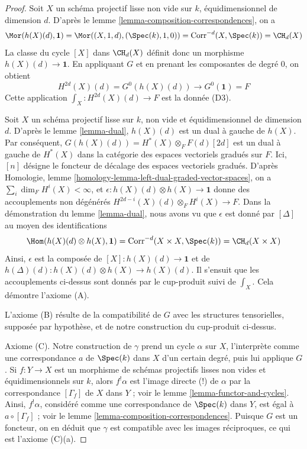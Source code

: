 \begin{proof}
\medskip\noindent
Soit $X$ un schéma projectif lisse non vide sur $k$,
équidimensionnel de dimension $d$. D'après
le lemme \ref{lemma-composition-correspondences}, on a
$$
\Mor(h(X)(d), \mathbf{1}) = \Mor((X, 1, d), (\Spec(k), 1, 0)) =
\text{Corr}^{-d}(X, \Spec(k)) = \CH_d(X)
$$
La classe du cycle $[X]$ dans $\CH_d(X)$ définit donc un morphisme
$h(X)(d) \to \mathbf{1}$. En appliquant $G$ et en prenant les composantes de degré $0$,
on obtient
$$
H^{2d}(X)(d) = G^0(h(X)(d)) \longrightarrow G^0(\mathbf{1}) = F
$$
Cette application $\int_X : H^{2d}(X)(d) \to F$ est la donnée (D3).

\medskip\noindent
Soit $X$ un schéma projectif lisse sur $k$,
non vide et équidimensionnel de dimension $d$. D'après le lemme \ref{lemma-dual},
$h(X)(d)$ est un dual à gauche de $h(X)$. Par conséquent,
$G(h(X)(d)) = H^*(X) \otimes_F F(d)[2d]$
est un dual à gauche de $H^*(X)$ dans la catégorie des espaces vectoriels gradués sur $F$.
Ici, $[n]$ désigne le foncteur de décalage des espaces vectoriels gradués.
D'après Homologie, lemme \ref{homology-lemma-left-dual-graded-vector-spaces},
on a $\sum_i \dim_F H^i(X) < \infty$, et
$\epsilon : h(X)(d) \otimes h(X) \to \mathbf{1}$ donne
des accouplements non dégénérés $H^{2d - i}(X)(d) \otimes_F H^i(X) \to F$.
Dans la démonstration du lemme \ref{lemma-dual}, nous avons vu que
$\epsilon$ est donné par $[\Delta]$ au moyen des identifications
$$
\Hom(h(X)(d) \otimes h(X), \mathbf{1}) =
\text{Corr}^{-d}(X \times X, \Spec(k)) =
\CH_d(X \times X)
$$
Ainsi, $\epsilon$ est la composée de $[X] : h(X)(d) \to \mathbf{1}$
et de $h(\Delta)(d) : h(X)(d) \otimes h(X) \to h(X)(d)$. Il s'ensuit
que les accouplements ci-dessus sont donnés par le cup-produit suivi de
$\int_X$. Cela démontre l'axiome (A).

\medskip\noindent
L'axiome (B) résulte de la compatibilité de $G$ avec les structures
tensorielles, supposée par hypothèse, et de notre construction du cup-produit ci-dessus.

\medskip\noindent
Axiome (C). Notre construction de $\gamma$ prend un cycle $\alpha$ sur $X$,
l'interprète comme une correspondance $a$ de $\Spec(k)$ dans $X$ d'un certain degré,
puis lui applique $G$. Si $f : Y \to X$ est un morphisme de schémas projectifs lisses
non vides et équidimensionnels sur $k$, alors
$f^!\alpha$ est l'image directe (!) de $\alpha$
par la correspondance $[\Gamma_f]$ de $X$ dans $Y$ ; voir
le lemme \ref{lemma-functor-and-cycles}. Ainsi,
$f^!\alpha$, considéré comme une correspondance de $\Spec(k)$ dans $Y$,
est égal à $a \circ [\Gamma_f]$ ; voir
le lemme \ref{lemma-composition-correspondences}.
Puisque $G$ est un foncteur, on en déduit que
$\gamma$ est compatible avec les images réciproques, ce qui est l'axiome (C)(a).


\end{proof}
